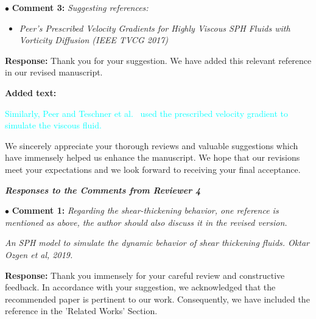 \documentclass[12pt,a4paper]{article}
\newcommand{\revised}[1]{\textcolor{cyan}{#1}}
\begin{document}

\vspace{0.4cm}
\noindent$\bullet$ \enspace \textbf{Comment 3:}
\textit{Suggesting references:}
\begin{itemize}
	\item \textit{Peer's Prescribed Velocity Gradients for Highly Viscous SPH Fluids with Vorticity Diffusion (IEEE TVCG 2017) }
\end{itemize}


\vspace{0.2cm}
\textbf{Response:}
Thank you for your suggestion. We have added this relevant reference in our revised manuscript. 


\vspace{0.2cm}
\textbf{Added text:}

\revised{Similarly, Peer and Teschner et al.~\cite{Peer2017-Prescribed} used the prescribed velocity gradient to simulate the viscous fluid.}


We sincerely appreciate your thorough reviews and valuable suggestions which have immensely helped us enhance the manuscript. We hope that our revisions meet your expectations and we look forward to receiving your final acceptance.

\newpage
\vspace{-1.5cm}
\begin{flushleft}
	\textit{\textbf{Responses to the Comments from Reviewer 4}}
\end{flushleft}



\vspace{0.4cm}
\noindent$\bullet$ \enspace \textbf{Comment 1:}
\textit{Regarding the shear-thickening behavior, one reference is mentioned as above, the author should also discuss it in the revised version.}

\textit{An SPH model to simulate the dynamic behavior of shear thickening fluids. Oktar Ozgen et al, 2019.}

\vspace{0.2cm}
\textbf{Response:}
Thank you immensely for your careful review and constructive feedback. In accordance with your suggestion, we acknowledged that the recommended paper is pertinent to our work. Consequently, we have included the reference in the 'Related Works' Section.
\end{document}
